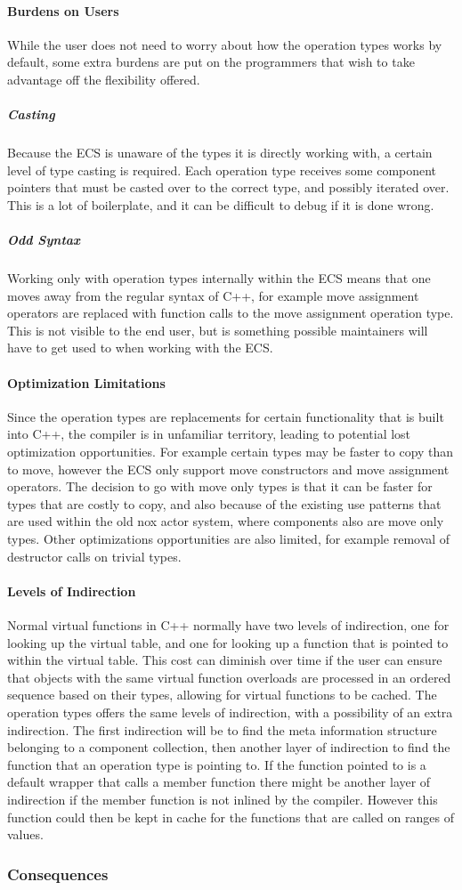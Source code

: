 \paragraph{Burdens on Users}
While the user does not need to worry about how the operation types works by default,
some extra burdens are put on the programmers that wish to take advantage off the flexibility offered.

\subparagraph{Casting}
Because the ECS is unaware of the types it is directly working with, a certain level of type casting is required.
Each operation type receives some component pointers that must be casted over to the correct type,
and possibly iterated over. This is a lot of boilerplate, and it can be difficult to debug if it is done wrong.

\subparagraph{Odd Syntax}
Working only with operation types internally within the ECS means that one moves away from the regular syntax of C++,
for example move assignment operators are replaced with function calls to the move assignment operation type.
This is not visible to the end user, but is something possible maintainers will have to get used to when working with the ECS.

\paragraph{Optimization Limitations}
Since the operation types are replacements for certain functionality that is built into C++, the compiler is in
unfamiliar territory, leading to potential lost optimization opportunities.
For example certain types may be faster to copy than to move, however the ECS only support move constructors
and move assignment operators.
The decision to go with move only types is that it can be faster for types that are costly to copy,
and also because of the existing use patterns that are used within the old nox actor system, where components
also are move only types.
Other optimizations opportunities are also limited, for example removal of destructor calls on trivial types.

\paragraph{Levels of Indirection}
Normal virtual functions in C++ normally have two levels of indirection, one for looking up the virtual table,
and one for looking up a function that is pointed to within the virtual table.
This cost can diminish over time if the user can ensure that objects with the same virtual function overloads
are processed in an ordered sequence based on their types, allowing for virtual functions to be cached.
The operation types offers the same levels of indirection, with a possibility of an extra indirection.
The first indirection will be to find the meta information structure belonging to a component collection,
then another layer of indirection to find the function that an operation type is pointing to.
If the function pointed to is a default wrapper that calls a member function there might be another layer of indirection
if the member function is not inlined by the compiler.
However this function could then be kept in cache for the functions that are called on ranges of values.

\subsubsection{Consequences}
